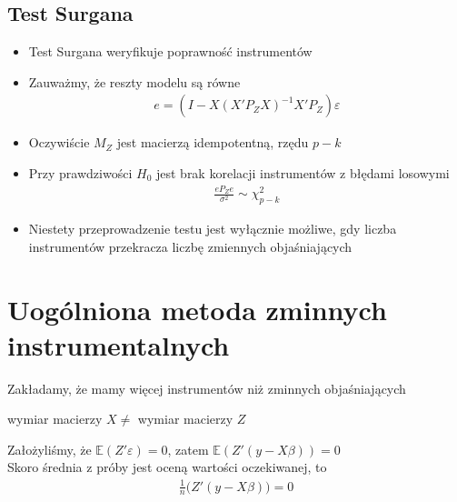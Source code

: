\subsection{Test Surgana}
\begin{itemize}
	\item Test Surgana weryfikuje poprawność instrumentów
	\item Zauważmy, że reszty modelu są równe
	\begin{gather*}
	e=\left(I-X\left(X'P_ZX\right)^{-1}X'P_Z\right)\varepsilon
	\end{gather*}
	\item Oczywiście $ M_Z $ jest macierzą idempotentną, rzędu $ p-k $
	\item Przy prawdziwości $ H_0 $ jest brak korelacji instrumentów z błędami losowymi
	\begin{gather*}
	\frac{eP_Ze}{\sigma^2}\sim \chi^2_{p-k}
\end{gather*}
\item Niestety przeprowadzenie testu jest wyłącznie możliwe, gdy liczba instrumentów przekracza liczbę zmiennych objaśniających
\end{itemize}
\section{Uogólniona metoda zminnych instrumentalnych}
Zakładamy, że mamy więcej instrumentów niż zminnych objaśniających
\begin{center}
wymiar macierzy $ X \neq $ wymiar macierzy $ Z $
\end{center}
Założyliśmy, że $ \mathbb E \left(Z'\varepsilon\right) =0$, zatem $ \mathbb E \left(Z'\left(y-X\beta\right)\right) =0$\\
Skoro średnia z próby jest oceną wartości oczekiwanej, to
\begin{gather*}
\tfrac{1}{n}\bigl(Z'\left(y-X\beta\right)\bigr)=0
\end{gather*}
